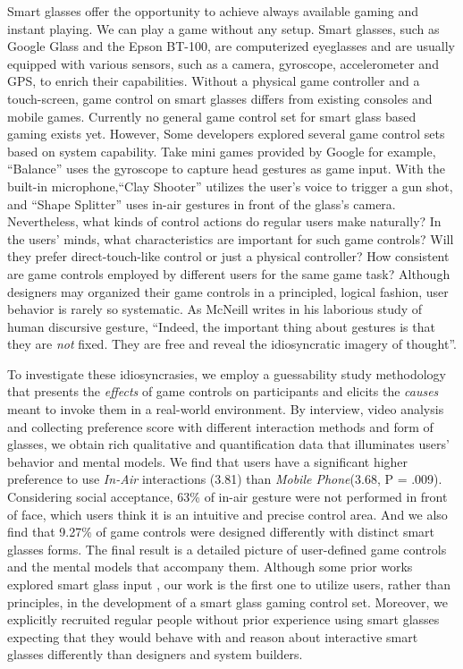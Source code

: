 \documentclass{sigchi}
\begin{document}
Smart glasses offer the opportunity to achieve always available gaming and instant playing. We can play a game without any setup. Smart glasses, such as Google Glass and the Epson BT-100, are computerized eyeglasses and are usually equipped with various sensors, such as a camera, gyroscope, accelerometer and GPS, to enrich their capabilities. 
Without a physical game controller and a touch-screen, game control on smart glasses differs from existing consoles and mobile games. Currently no general game control set for smart glass based gaming exists yet. However, Some developers explored several game control sets based on system capability. Take mini games \cite{MiniGames} provided by Google for example, ``Balance'' uses the gyroscope to capture head gestures as game input. With the built-in microphone,``Clay Shooter'' utilizes the user's voice to trigger a gun shot, and ``Shape Splitter'' uses in-air gestures in front of the glass's camera.  
Nevertheless, what kinds of control actions do regular users make naturally? In the users' minds, what characteristics are important for such game controls? Will they prefer direct-touch-like control or just a physical controller? How consistent are game controls employed by different users for the same game task? 
Although designers may organized their game controls in a principled, logical fashion, user behavior is rarely so systematic. As McNeill \cite{HandAndMind} writes in his laborious study of human discursive gesture, ``Indeed, the important thing about gestures is that they are \emph{not} fixed. They are free and reveal the idiosyncratic imagery of thought''.


To investigate these idiosyncrasies, we employ a guessability study methodology \cite{Wobbrock:2005:MGS:1056808.1057043} that presents the \emph{effects} of game controls on participants and elicits the \emph{causes} meant to invoke them in a real-world environment. By interview, video analysis and collecting preference score with different interaction methods and form of glasses, we obtain rich qualitative and quantification data that illuminates users' behavior and mental models. 
We find that users have a significant higher preference to use \emph{In-Air} interactions (3.81) than \emph{Mobile Phone}(3.68, P = .009). 
Considering social acceptance, 63\% of in-air gesture were not performed in front of face, which users think it is an intuitive and precise control area. 
And we also find that 9.27\% of game controls were designed differently with distinct smart glasses forms.
 The final result is a detailed picture of user-defined game controls and the mental models that accompany them. Although some prior works explored smart glass input \cite{Colaco:2013:MCL:2501988.2502042,Serrano:2014:EUH:2611247.2556984}, our work is the first one to utilize users, rather than principles, in the development of a smart glass gaming control set. Moreover, we explicitly recruited regular people without prior experience using smart glasses expecting that they would behave with and reason about interactive smart glasses differently than designers and system builders.
\end{document}
